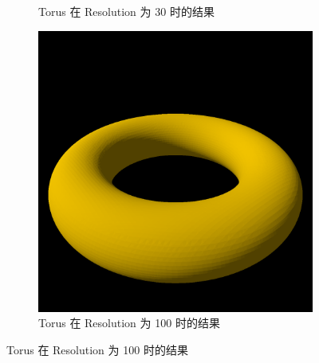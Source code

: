\documentclass[UTF8]{ctexart}
\begin{document}
\begin{figure}[h]
\begin{subfigure}[b]{0.48\textwidth}
        \caption{Torus 在 Resolution 为 30 时的结果}
    \end{subfigure}
    \hfill
    \begin{subfigure}[b]{0.48\textwidth}
        \centering
        \includegraphics[height=0.3\textheight]{images/5-4.png}
        \caption{Torus 在 Resolution 为 100 时的结果}
    \end{subfigure}
\end{figure}
\end{document}
